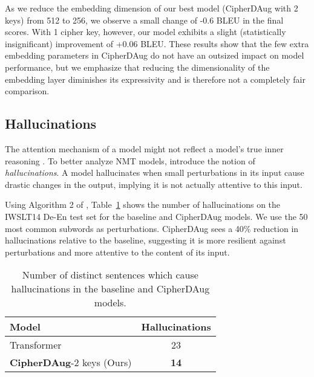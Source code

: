 \documentclass[11pt]{article}
\begin{document}
As we reduce the embedding dimension of our best model (CipherDAug with 2 keys) from 512 to 256, we observe a small change of -0.6 BLEU in the final scores. With 1 cipher key, however, our model exhibits a slight (statistically insignificant) improvement of +0.06 BLEU. These results show that the few extra embedding parameters in CipherDAug do not have an outsized impact on model performance, but we emphasize that reducing the dimensionality of the embedding layer diminishes its expressivity and is therefore not a completely fair comparison.

\subsection{Hallucinations}


The attention mechanism of a model might not reflect a model's true inner reasoning \cite{jain-wallace-2019-attention, moradi-etal-2019-interrogating, moradi-etal-2021-measuring}. To better analyze NMT models, 
\citet{lee-hallucinations} introduce the notion of \textit{hallucinations}. A model hallucinates when small perturbations in its input cause drastic changes in the output, implying it is not actually attentive to this input. 


Using Algorithm 2 of \citet{raunak-etal-2021-curious}, Table~\ref{tab:hallucinations_count} shows the number of hallucinations on the IWSLT14 De-En test set for the baseline and CipherDAug models. We use the 50 most common subwords as perturbations. 
CipherDAug sees a 40\% reduction in hallucinations relative to the baseline, suggesting it is more resilient against perturbations and more attentive to the content of its input.

\begin{table}[htb]
    \small
    \centering
    \begin{tabular}{l c}
        \textbf{Model} & \textbf{Hallucinations} \\\midrule
        Transformer & \cellcolor[HTML]{FFCCC9}23 \\\midrule
        \textbf{CipherDAug}-2 keys (Ours) & \cellcolor[HTML]{9AFF99}\textbf{14}\\\bottomrule
    \end{tabular}
    \caption{Number of distinct sentences which cause hallucinations in the baseline and CipherDAug models.}
    \label{tab:hallucinations_count}
    \vspace{-1.5em}
\end{table}
\end{document}
